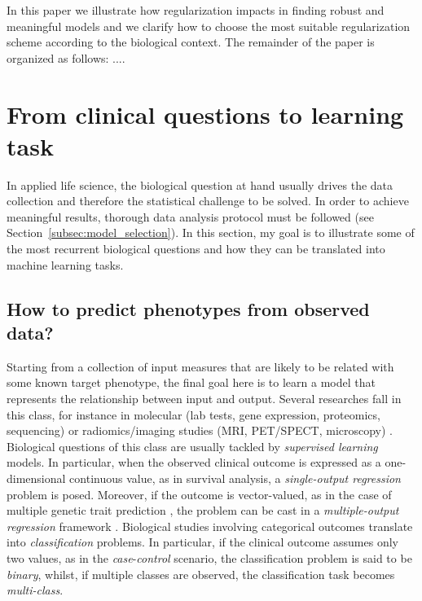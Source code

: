 %
%
In this paper we illustrate how regularization impacts in finding robust and meaningful models and we clarify how to choose the most suitable regularization scheme according to the biological context. The remainder of the paper is organized as follows: ....


\section{From clinical questions to learning task}
In applied life science, the biological question at hand usually drives the data collection and therefore the statistical challenge to be solved. In order to achieve meaningful results, thorough data analysis protocol must be followed (see Section~\ref{subsec:model_selection}).
In this section, my goal is to illustrate some of the most recurrent biological questions and how they can be translated into machine learning tasks.


\subsection{How to predict phenotypes from observed data?} %
Starting from a collection of input measures that are likely to be related with some known target phenotype, the final goal here is to learn a model that represents the relationship between input and output. Several researches fall in this class, for instance in molecular (\eg lab tests, gene expression, proteomics, sequencing) \cite{angermueller2016deep, okser2014regularized, abraham2013performance} or radiomics/imaging studies (\eg MRI, PET/SPECT, microscopy) \cite{min2016deep, helmstaedter2013connectomic}. Biological questions of this class are usually tackled by \textit{supervised learning} models. In particular, when the observed clinical outcome is expressed as a one-dimensional continuous value, as in survival analysis, a \textit{single-output regression} problem is posed. Moreover, if the outcome is vector-valued, as in the case of multiple genetic trait prediction \cite{he2016novel}, the problem can be cast in a \textit{multiple-output regression }framework \cite{argyriou2008convex, baldassarre2012multi}. Biological studies involving categorical outcomes translate into \textit{classification} problems. In particular, if the clinical outcome assumes only two values, as in the \textit{case}-\textit{control} scenario, the classification problem is said to be \textit{binary}, whilst, if multiple classes are observed, the classification task becomes \textit{multi-class}.

